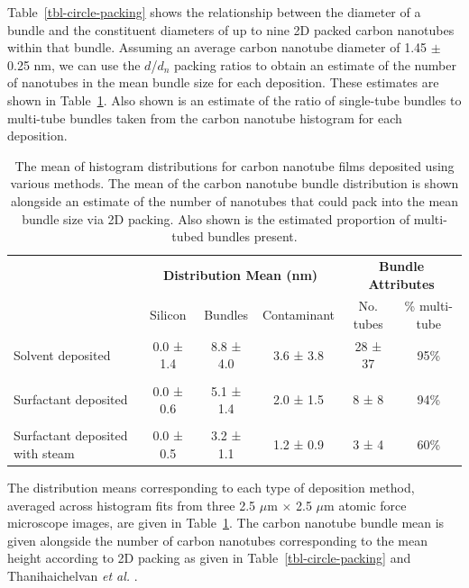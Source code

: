 \documentclass[
  a4paper,
]{scrbook}
\begin{document}
Table~\ref{tbl-circle-packing} shows the relationship between the
diameter of a bundle and the constituent diameters of up to nine 2D
packed carbon nanotubes within that bundle. Assuming an average carbon
nanotube diameter of 1.45 \(\pm\) 0.25 nm, we can use the \(d\)/\(d_n\)
packing ratios to obtain an estimate of the number of nanotubes in the
mean bundle size for each deposition. These estimates are shown in
Table~\ref{tbl-histogram-parameters}. Also shown is an estimate of the
ratio of single-tube bundles to multi-tube bundles taken from the carbon
nanotube histogram for each deposition.

\hypertarget{tbl-histogram-parameters}{}
\begin{table}
\caption{\label{tbl-histogram-parameters}The mean of histogram distributions for carbon nanotube films deposited
using various methods. The mean of the carbon nanotube bundle
distribution is shown alongside an estimate of the number of nanotubes
that could pack into the mean bundle size via 2D packing. Also shown is
the estimated proportion of multi-tubed bundles present. }\tabularnewline

\centering
\begin{tabular}{>{\raggedright\arraybackslash}p{2cm}ccccc}
\toprule
\multicolumn{1}{c}{\textbf{ }} & \multicolumn{3}{c}{\textbf{Distribution Mean (nm)}} & \multicolumn{2}{c}{\textbf{Bundle Attributes}} \\
\cmidrule(l{3pt}r{3pt}){2-4} \cmidrule(l{3pt}r{3pt}){5-6}
 & Silicon & Bundles & Contaminant & No. tubes & \% multi-tube\\
\midrule
Solvent deposited & 0.0 ± 1.4 & 8.8 ± 4.0 & 3.6 ± 3.8 & 28 ± 37 & 95\%\\
 &  &  &  &  \vphantom{1} & \\
Surfactant deposited & 0.0 ± 0.6 & 5.1 ± 1.4 & 2.0 ± 1.5 & 8  ± 8 & 94\%\\
 &  &  &  &  & \\
Surfactant deposited with steam & 0.0 ± 0.5 & 3.2 ± 1.1 & 1.2 ± 0.9 & 3 ± 4 & 60\%\\
\bottomrule
\end{tabular}
\end{table}

The distribution means corresponding to each type of deposition method,
averaged across histogram fits from three 2.5 \(\mu\)m \(\times\) 2.5
\(\mu\)m atomic force microscope images, are given in
Table~\ref{tbl-histogram-parameters}. The carbon nanotube bundle mean is
given alongside the number of carbon nanotubes corresponding to the mean
height according to 2D packing as given in
Table~\ref{tbl-circle-packing} and Thanihaichelvan \emph{et al.}
\autocite{Thanihaichelvan2018}.
\end{document}
